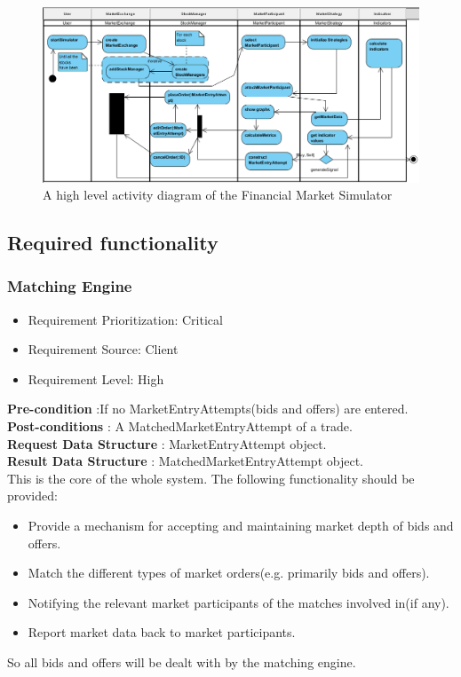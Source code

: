\documentclass[12pt]{article}
\begin{document}
			\begin{figure}[th]
			\centering
			\includegraphics[scale=0.6]{activity}
			\caption{A high level activity diagram of the Financial Market Simulator}
			\label{domain objects}
			\end{figure}
		\pagebreak			    
		\subsection{Required functionality}	
				\subsubsection{Matching Engine}
				\begin{itemize}
					\item Requirement Prioritization: Critical
					\item Requirement Source: Client 	
					\item Requirement Level: High
				\end{itemize}
			 	
				\textbf{Pre-condition} :If no MarketEntryAttempts(bids and offers) are entered.\\
			 	\textbf{Post-conditions} : A MatchedMarketEntryAttempt of a trade.\\ 
			 	\textbf{Request Data Structure} : MarketEntryAttempt object.\\
			 	\textbf{Result Data Structure} : MatchedMarketEntryAttempt object.\\
			 	
				This is the core of the whole system. The following functionality should be provided:
					\begin{itemize}
						\item Provide a mechanism for accepting and maintaining market depth of bids and offers.
						\item Match the different types of market orders(e.g. primarily bids and offers).
						\item Notifying the relevant market participants of the matches involved in(if any).
						\item Report market data back to market participants.
					\end{itemize}
				So all bids and offers will be dealt with by the matching engine.	
				
\end{document}
